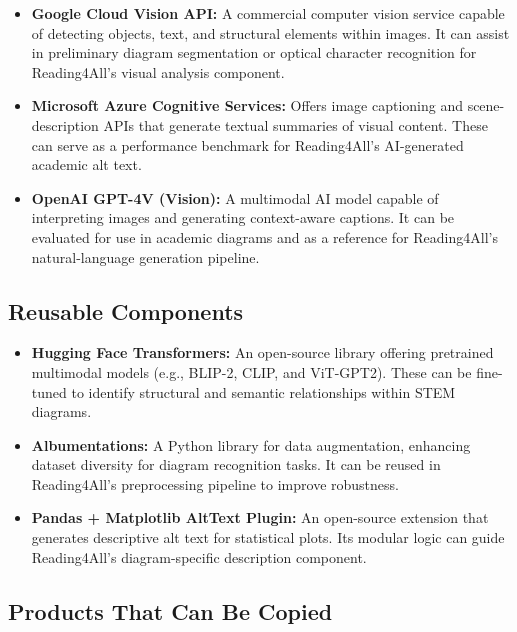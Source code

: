 \documentclass[12pt]{article}
\begin{document}
\begin{itemize}
    \item \textbf{Google Cloud Vision API:} A commercial computer vision service capable of detecting objects, text, and structural elements within images. It can assist in preliminary diagram segmentation or optical character recognition for Reading4All’s visual analysis component.

    \item \textbf{Microsoft Azure Cognitive Services:} Offers image captioning and scene-description APIs that generate textual summaries of visual content. These can serve as a performance benchmark for Reading4All’s AI-generated academic alt text.

    \item \textbf{OpenAI GPT-4V (Vision):} A multimodal AI model capable of interpreting images and generating context-aware captions. It can be evaluated for use in academic diagrams and as a reference for Reading4All’s natural-language generation pipeline.
\end{itemize}

\subsection{Reusable Components}

\begin{itemize}
    \item \textbf{Hugging Face Transformers:} An open-source library offering pretrained multimodal models (e.g., BLIP-2, CLIP, and ViT-GPT2). These can be fine-tuned to identify structural and semantic relationships within STEM diagrams.

    \item \textbf{Albumentations:} A Python library for data augmentation, enhancing dataset diversity for diagram recognition tasks. It can be reused in Reading4All’s preprocessing pipeline to improve robustness.

    \item \textbf{Pandas + Matplotlib AltText Plugin:} An open-source extension that generates descriptive alt text for statistical plots. Its modular logic can guide Reading4All’s diagram-specific description component.
\end{itemize}

\subsection{Products That Can Be Copied}
\end{document}
